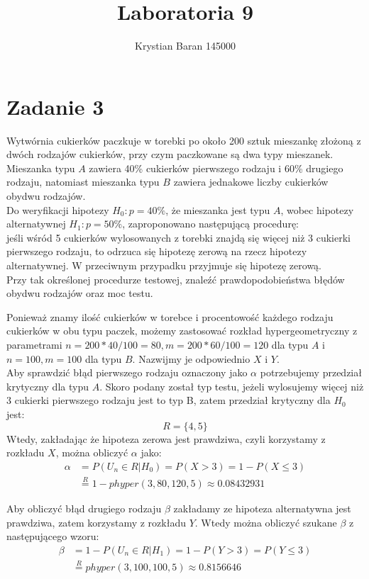\documentclass{article}
\author{Krystian Baran 145000}
\title{Laboratoria 9}
\begin{document}
\maketitle
\newpage

\tableofcontents
\newpage

\section{Zadanie 3}
Wytwórnia cukierków paczkuje w torebki po około 200 sztuk mieszankę złożoną z dwóch rodzajów cukierków, przy czym paczkowane są dwa typy mieszanek. Mieszanka typu $A$ zawiera 40\% cukierków pierwszego rodzaju i 60\% drugiego rodzaju, natomiast mieszanka typu $B$ zawiera jednakowe liczby cukierków obydwu rodzajów. \\
Do weryfikacji hipotezy $H_0:p=40\%$, że mieszanka jest typu $A$, wobec hipotezy alternatywnej $H_1:p=50\%$, zaproponowano następującą procedurę:\\ jeśli wśród 5 cukierków wylosowanych z torebki znajdą się więcej niż 3 cukierki pierwszego rodzaju, to odrzuca się hipotezę zerową na rzecz hipotezy alternatywnej. W przeciwnym przypadku przyjmuje się hipotezę zerową.\\
Przy tak określonej procedurze testowej, znaleźć prawdopodobieństwa błędów obydwu rodzajów oraz moc testu. \\ \par

Ponieważ znamy ilość cukierków w torebce i procentowość każdego rodzaju cukierków w obu typu paczek, możemy zastosować rozkład hypergeometryczny z parametrami $n = 200*40/100 = 80, m = 200*60/100 = 120$ dla typu $A$ i $n = 100, m = 100$ dla typu $B$. Nazwijmy je odpowiednio $X$ i $Y$.\\
Aby sprawdzić błąd pierwszego rodzaju oznaczony jako $\alpha$ potrzebujemy przedział krytyczny dla typu $A$. Skoro podany został typ testu, jeżeli wylosujemy więcej niż 3 cukierki pierwszego rodzaju jest to typ B, zatem przedział krytyczny dla $H_0$ jest:
\[ R = \{4,5\} \]
Wtedy, zakładając że hipoteza zerowa jest prawdziwa, czyli korzystamy z rozkładu $X$, można obliczyć $\alpha$ jako:
\begin{align*}
\alpha & = P(U_n \in R | H_0) = P(X > 3) = 1 - P(X \leq 3) \\
& \overset{R}{=} 1 - phyper(3, 80, 120, 5) \approx 0.08432931
\end{align*}

Aby obliczyć błąd drugiego rodzaju $\beta$ zakładamy ze hipoteza alternatywna jest prawdziwa, zatem korzystamy z rozkładu $Y$.
Wtedy można obliczyć szukane $\beta$ z następującego wzoru:
\begin{align*}
\beta & = 1 - P(U_n \in R | H_1) = 1 - P(Y > 3) = P(Y \leq 3) \\
& \overset{R}{=} phyper(3, 100, 100, 5) \approx 0.8156646
\end{align*}
\end{document}
